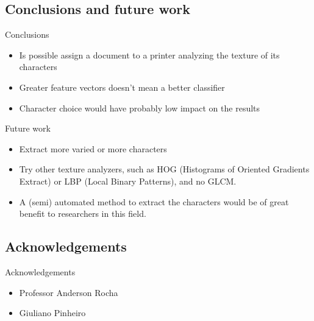 \documentclass[notes]{beamer}
\begin{document}
\begin{frame}
\section{Conclusions and future work}

\begin{block}{Conclusions}

\begin{itemize}

\item Is possible assign a document to a printer analyzing the texture of its characters

\item Greater feature vectors doesn’t mean a better classifier

\item Character choice would have probably low impact on the results

\end{itemize}

\end{block}

\end{frame}

\begin{frame}

\begin{block}{Future work}

\begin{itemize}

\item Extract more varied or more characters

\item Try other texture analyzers, such as HOG (Histograms of Oriented Gradients Extract) or LBP (Local Binary Patterns), and no GLCM.

\item A (semi) automated method to extract the characters would be of great benefit to researchers in this field.

\end{itemize}

\end{block}

\end{frame}

\begin{frame}
\section{Acknowledgements}

\begin{block}{Acknowledgements}

\begin{itemize}

\item Professor Anderson Rocha

\item Giuliano Pinheiro

\end{itemize}

\end{block}

\end{frame}
\end{document}
